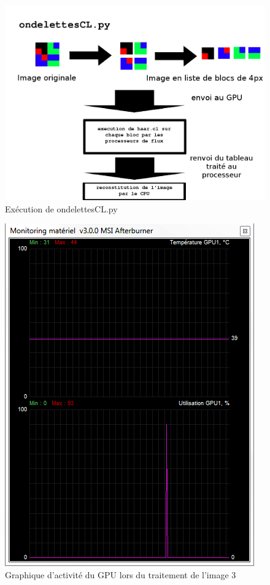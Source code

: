 \documentclass{article}
\begin{document}
\begin{figure}[!h]
\centering
\includegraphics[scale=0.4]{images/haarcl.png}
\caption{Exécution de ondelettesCL.py}
\label{haarcl}
\end{figure}

\begin{figure}[!h]
\centering
\includegraphics[scale=0.7]{images/monitor.png}
\caption{Graphique d'activité du GPU lors du traitement de l'image 3}
\label{afterburn}
\end{figure}
\end{document}
